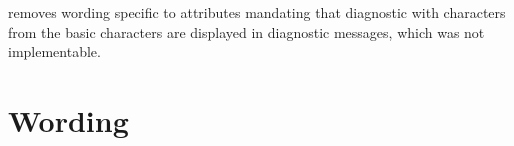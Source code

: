 \documentclass{wg21}
\begin{document}
 removes wording specific to attributes mandating that diagnostic with characters
from the basic characters are displayed in diagnostic messages, which was not implementable.

\section{Wording}


%
\end{document}
